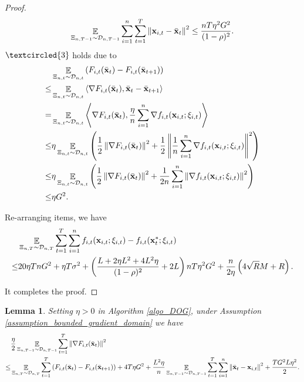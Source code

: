 \documentclass{article}
\newtheorem{Lemma}{\bf{Lemma}}
\begin{document}
\begin{proof}
\begin{align}
\nonumber
\mathop{\mathbb{E}}_{ \Xi_{n,T-1} \sim \mathcal{D}_{n,T-1} } \sum_{i=1}^n\sum_{t=1}^T \left\lVert{\bf x}_{i,t} - \bar{{\bf x}}_t\right\rVert^2 \le \frac{nT\eta^2 G^2 }{(1-\rho)^2}.
\end{align} $\textcircled{3}$ holds due to 
\begin{align}
\nonumber
& \mathop{\mathbb{E}}_{ \Xi_{n,t} \sim \mathcal{D}_{n,t} } \left( F_{i,t}(\bar{{\bf x}}_t) - F_{i,t}(\bar{{\bf x}}_{t+1})  \right) \\ \nonumber 
\le & \mathop{\mathbb{E}}_{ \Xi_{n,t} \sim \mathcal{D}_{n,t} } \left\langle\nabla F_{i,t}(\bar{{\bf x}}_t), \bar{{\bf x}}_t - \bar{{\bf x}}_{t+1} \right\rangle \\ \nonumber
= & \mathop{\mathbb{E}}_{ \Xi_{n,t} \sim \mathcal{D}_{n,t} } \left\langle\nabla F_{i,t}(\bar{{\bf x}}_t), \frac{\eta}{n}\sum_{i=1}^n\nabla f_{i,t}({\bf x}_{i,t};\xi_{i,t})  \right\rangle \\ \nonumber
\le & \eta\mathop{\mathbb{E}}_{ \Xi_{n,t} \sim \mathcal{D}_{n,t} }\left(  \frac{1}{2}\left\lVert\nabla F_{i,t}(\bar{{\bf x}}_t)\right\rVert^2 + \frac{1}{2} \left\lVert\frac{1}{n}\sum_{i=1}^n\nabla f_{i,t}({\bf x}_{i,t};\xi_{i,t})\right\rVert^2  \right)\\ \nonumber
\le & \eta\mathop{\mathbb{E}}_{ \Xi_{n,t} \sim \mathcal{D}_{n,t} }\left(  \frac{1}{2}\left\lVert\nabla F_{i,t}(\bar{{\bf x}}_t)\right\rVert^2 + \frac{1}{2n}\sum_{i=1}^n\left\lVert\nabla f_{i,t}({\bf x}_{i,t};\xi_{i,t})\right\rVert^2  \right)\\ \nonumber
\le & \eta G^2. 
\end{align}

Re-arranging items, we have
\begin{align}
\nonumber
& \mathop{\mathbb{E}}_{ \Xi_{n,T} \sim \mathcal{D}_{n,T} } \sum_{t=1}^T\sum_{i=1}^n f_{i,t}({\bf x}_{i,t};\xi_{i,t}) - f_{i,t}({\bf x}_t^\ast;\xi_{i,t}) \\ \nonumber
\le & 20\eta T n G^2 +  \eta T\sigma^2 + \left( \frac{L + 2\eta L^2  + 4L^2 \eta}{(1-\rho)^2} +2L \right)  nT\eta^2 G^2    + \frac{n}{2\eta}\left(  4\sqrt{R}M + R   \right).
\end{align}

It completes the proof.



\end{proof}




\begin{Lemma}
\label{Lemma_gradient_norm_bound}
Setting $\eta>0$ in Algorithm \ref{algo_DOG}, under Assumption \ref{assumption_bounded_gradient_domain} we have 
\begin{align}
& \frac{\eta}{2} \mathop{\mathbb{E}}_{ \Xi_{n,T-1} \sim \mathcal{D}_{n,T-1} }\sum_{t=1}^T \left\lVert\nabla F_{i,t}(\bar{{\bf x}}_t)\right\rVert^2 \\ \nonumber
\le & \mathop{\mathbb{E}}_{ \Xi_{n,T} \sim \mathcal{D}_{n,T} } \sum_{t=1}^T  \left( F_{i,t}(\bar{{\bf x}}_t) - F_{i,t}(\bar{{\bf x}}_{t+1}) \right) + 4T  \eta G^2 + \frac{ L^2 \eta}{n}\mathop{\mathbb{E}}_{ \Xi_{n,T-1} \sim \mathcal{D}_{n,T-1} }\sum_{t=1}^T\sum_{i=1}^n \left\lVert \bar{{\bf x}}_t - {\bf x}_{i,t} \right\rVert^2 + \frac{TG^2L\eta^2}{2}.
\end{align}
\end{Lemma}
\end{document}
